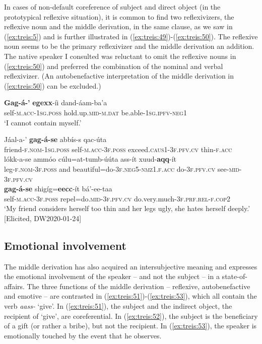 \documentclass[output=paper]{langscibook}
\begin{document}
In cases of non-default coreference of subject and direct object (in the prototypical reflexive situation), it is common to find two reflexivizers, the reflexive noun and the middle derivation, in the same clause, as we saw in (\ref{ex:treis:5}) and is further illustrated in (\ref{ex:treis:49})-(\ref{ex:treis:50}). The reflexive noun seems to be the primary reflexivizer and the middle derivation an addition. The native speaker I consulted was reluctant to omit the reflexive nouns in (\ref{ex:treis:50}) and preferred the combination of the nominal and verbal reflexivizer. (An autobenefactive interpretation of the middle derivation in (\ref{ex:treis:50}) can be excluded.)

\ea\label{ex:treis:49} 
\gll \textbf{Gag-á-’} \textbf{egexx}-íi dand-áam-ba’a\\
     self\textsc{-m.acc-1sg.poss} hold.up.\textsc{mid-m.dat} be.able-\textsc{1sg.ipfv-neg1}\\
\glt ‘I cannot contain myself.’ \citep[37]{Saint-Exupéry2018}\z

\ea\label{ex:treis:50} 
\gll Jáal-a-’ \textbf{gag-á-se} abbís-s qac-úta \\
     friend-\textsc{f.nom-1sg.poss} self-\textsc{m.acc-3f.poss} exceed.\textsc{caus1-3f.pfv.cv} thin-\textsc{f.acc}\\
\gll lókk-a-se ammóo cúlu=at-tumb-úúta ass-ít xuud-\textbf{aqq}-ít\\
     leg-\textsc{f.nom-3f.poss} and beautiful=do-\textsc{3f.neg5-nmz1.f.acc} do-\textsc{3f.pfv.cv} see-\textsc{mid-3f.pfv.cv}\\
\gll \textbf{gag-á-se} shigíg=\textbf{eecc}-ít bá’-ee-taa\\
     self-\textsc{m.acc-3f.poss} repel=do.\textsc{mid-3f.pfv.cv} do.very.much-\textsc{3f.prf.rel-f.cop2}\\
\glt ‘My friend considers herself too thin and her legs ugly, she hates herself deeply.’ [Elicited, DW2020-01-24]\z

\subsection{Emotional involvement}\label{sec:treis:4.3}

The middle derivation has also acquired an intersubjective meaning and expresses the emotional involvement of the speaker – and not the subject – in a state-of-affairs. The three functions of the middle derivation – reflexive, autobenefactive and emotive – are contrasted in (\ref{ex:treis:51})-(\ref{ex:treis:53}), which all contain the verb \textit{aass-} ‘give’. In (\ref{ex:treis:51}), the subject and the indirect object, the recipient of ‘give’, are coreferential. In (\ref{ex:treis:52}), the subject is the beneficiary of a gift (or rather a bribe), but not the recipient. In (\ref{ex:treis:53}), the speaker is emotionally touched by the event that he observes.
\end{document}

